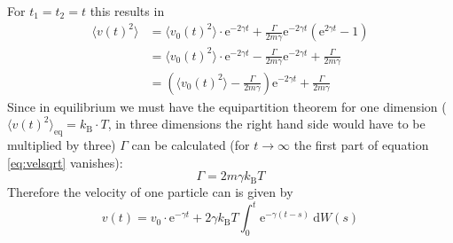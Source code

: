 \documentclass[12pt,a4paper]{scrartcl}
\begin{document}
For $t_1=t_2=t$ this results in
\begin{align}
	\langle v(t)^2\rangle &= \langle v_0(t)^2\rangle \cdot \text{e}^{-2\gamma t}+ \frac{\Gamma}{2 m\gamma} \text{e}^ {-2\gamma t}\left( \text{e}^ {2\gamma t} - 1 \right)\\
	&=\langle v_0(t)^2\rangle \cdot \text{e}^{-2\gamma t} - \frac{\Gamma}{2 m\gamma} \text{e}^ {-2\gamma t} + \frac{\Gamma}{2 m\gamma}\\
	&=\left( \langle v_0(t)^2\rangle - \frac{\Gamma}{2 m\gamma} \right) \text{e}^ {-2\gamma t} + \frac{\Gamma}{2 m\gamma} \label{eq:velsqrt}
\end{align}
Since in equilibrium we must have the equipartition theorem for one dimension ($\langle v(t)^2\rangle_{\text{eq}} = k_\text{B} \cdot T$, in three dimensions the right hand side would have to be multiplied by three) $\Gamma$ can be calculated (for $t \rightarrow \infty$ the first part of equation \ref{eq:velsqrt} vanishes):
\begin{equation}
	\Gamma = 2 m\gamma k_\text{B} T
\end{equation}
Therefore the velocity of one particle can is given by
\begin{equation}
	v(t) = v_0 \cdot \text{e}^{-\gamma t} + 2\gamma k_\text{B} T \int_0^t \text{e}^ {-\gamma(t-s)}~\text{d}W(s)
\end{equation}
\end{document}
